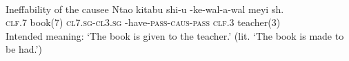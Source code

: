 \begin{exe}
\begin{xlist}
\ 
\\

\ex Ineffability of the causee
\gll * Nta\textbeltl o kitabu shi-u {-ke-wal\textramshorns-\textbeltl a-wal\textramshorns} meyi sh\textramshorns. \\
{} \textsc{clf.7} book(7) \textsc{cl7.sg}-\textsc{cl3.sg} -have-\textsc{pass}-\textsc{caus}-\textsc{pass} \textsc{clf.3} teacher(3) \\
\trans Intended meaning: `The book is given to the teacher.' (lit. `The book is made to be had.')
\end{xlist}
\end{exe}

